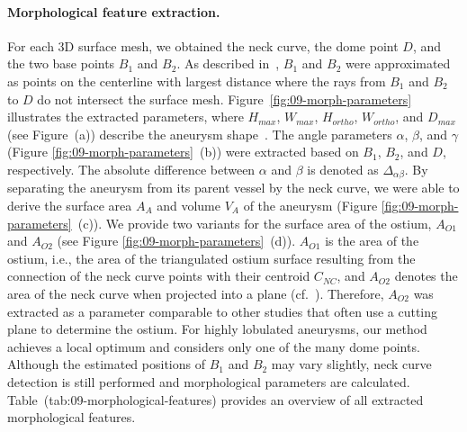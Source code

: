 \documentclass[
  oneside]{book}
\begin{document}
\paragraph*{Morphological feature extraction.}

For each 3D surface mesh, we obtained the neck curve, the dome point \(D\), and the two base points \(B_1\) and \(B_2\).
As described in~\autocite{Saalfeld2018}, \(B_1\) and \(B_2\) were approximated as points on the centerline with largest distance where the rays from \(B_1\) and \(B_2\) to \(D\) do not intersect the surface mesh.
Figure~\ref{fig:09-morph-parameters} illustrates the extracted parameters, where \(H_{max}\), \(W_{max}\), \(H_{ortho}\), \(W_{ortho}\), and \(D_{max}\) (see Figure~(a)) describe the aneurysm shape~\autocite{Dhar2008,LauricEtAl:Neurosurgery2012}.
The angle parameters \(\alpha\), \(\beta\), and \(\gamma\) (Figure \ref{fig:09-morph-parameters}~(b)) were extracted based on \(B_1\), \(B_2\), and \(D\), respectively.
The absolute difference between \(\alpha\) and \(\beta\) is denoted as \(\Delta_{\alpha\beta}\).
By separating the aneurysm from its parent vessel by the neck curve, we were able to derive the surface area \(A_A\) and volume \(V_A\) of the aneurysm (Figure \ref{fig:09-morph-parameters}~(c)).
We provide two variants for the surface area of the ostium, \(A_{O1}\) and \(A_{O2}\) (see Figure \ref{fig:09-morph-parameters}~(d)).
\(A_{O1}\) is the area of the ostium, i.e., the area of the triangulated ostium surface resulting from the connection of the neck curve points with their centroid \(C_{NC}\), and \(A_{O2}\) denotes the area of the neck curve when projected into a plane (cf.~\autocite{Saalfeld2018}).
Therefore, \(A_{O2}\) was extracted as a parameter comparable to other studies that often use a cutting plane to determine the ostium.
For highly lobulated aneurysms, our method achieves a local optimum and considers only one of the many dome points.
Although the estimated positions of \(B_1\) and \(B_2\) may vary slightly, neck curve detection is still performed and morphological parameters are calculated. Table~(tab:09-morphological-features) provides an overview of all extracted morphological features.
\end{document}
